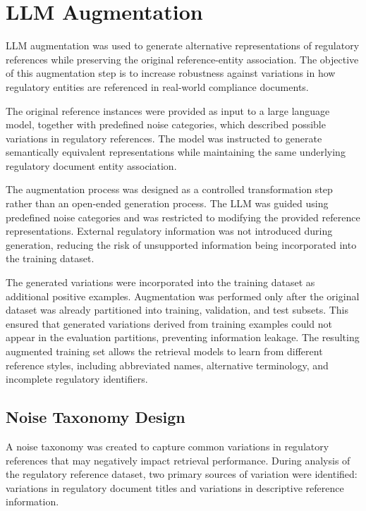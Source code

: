\section{LLM Augmentation}

LLM augmentation was used to generate alternative representations of regulatory references while preserving the original reference-entity association. The objective of this augmentation step is to increase robustness against variations in how regulatory entities are referenced in real-world compliance documents.

The original reference instances were provided as input to a large language model, together with predefined noise categories, which described possible variations in regulatory references. The model was instructed to generate semantically equivalent representations while maintaining the same underlying regulatory document entity association.

The augmentation process was designed as a controlled transformation step rather than an open-ended generation process. The LLM was guided using predefined noise categories and was restricted to modifying the provided reference representations. External regulatory information was not introduced during generation, reducing the risk of unsupported information being incorporated into the training dataset.

The generated variations were incorporated into the training dataset as additional positive examples. Augmentation was performed only after the original dataset was already partitioned into training, validation, and test subsets. This ensured that generated variations derived from training examples could not appear in the evaluation partitions, preventing information leakage. The resulting augmented training set allows the retrieval models to learn from different reference styles, including abbreviated names, alternative terminology, and incomplete regulatory identifiers.

\subsection{Noise Taxonomy Design}

A noise taxonomy was created to capture common variations in regulatory references that may negatively impact retrieval performance. During analysis of the regulatory reference dataset, two primary sources of variation were identified: variations in regulatory document titles and variations in descriptive reference information.

